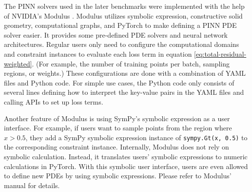 The PINN solvers used in the later benchmarks were implemented with the help of NVIDIA's Modulus \cite{noauthor_modulus_nodate}.
Modulus utilizes symbolic expression, constructive solid geometry, computational graphs, and PyTorch to make defining a PINN PDE solver easier.
It provides some pre-defined PDE solvers and neural network architectures.
Regular users only need to configure the computational domains and constraint instances to evaluate each loss term in equation \eqref{eq:total-residual-weighted}.
(For example, the number of training points per batch, sampling regions, or weights.)
These configurations are done with a combination of YAML files and Python code.
For simple use cases, the Python code only consists of several lines defining how to interpret the key-value pairs in the YAML files and calling APIs to set up loss terms.

Another feature of Modulus is using SymPy's symbolic expression \cite{meurer_sympy_2017} as a user interface.
For example, if users want to sample points from the region where $x > 0.5$, they add a SymPy symbolic expression instance of \lstinline{sympy.Gt(x, 0.5)} to the corresponding constraint instance.
Internally, Modulus does not rely on symbolic calculation.
Instead, it translates users' symbolic expressions to numeric calculations in PyTorch.
With this symbolic user interface, users are even allowed to define new PDEs by using symbolic expressions.
Please refer to Modulus' manual for details.

